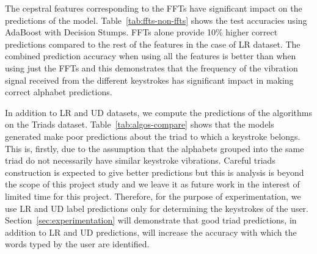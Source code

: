 \documentclass[11pt,conference]{IEEEtran}
\begin{document}
The cepstral features corresponding to the FFTs have significant impact on the predictions of the model. Table~\ref{tab:ffts-non-ffts} shows the test accuracies using AdaBoost with Decision Stumps. FFTs alone provide 10\% higher correct predictions compared to the rest of the features in the case of LR dataset. The combined prediction accuracy when using all the features is better than when using just the FFTs and this demonstrates that the frequency of the vibration signal received from the different keystrokes has significant impact in making correct alphabet predictions.

In addition to LR and UD datasets, we compute the predictions of the algorithms on the Triads dataset. Table~\ref{tab:algos-compare} shows that the models generated make poor predictions about the triad to which a keystroke belongs. This is, firstly, due to the assumption that the alphabets grouped into the same triad do not necessarily have similar keystroke vibrations. Careful triads construction is expected to give better predictions but this is analysis is beyond the scope of this project study and we leave it as future work in the interest of limited time for this project. Therefore, for the purpose of experimentation, we use LR and UD label predictions only for determining the keystrokes of the user. Section~\ref{sec:experimentation} will demonstrate that good triad predictions, in addition to LR and UD predictions, will increase the accuracy with which the words typed by the user are identified. 

\begin{table}[h]
\centering
{%
{}
}
\caption{Test accuracies on $1/3^{rd}$ of dataset}
\label{tab:algos-compare}
\end{table}
\end{document}
